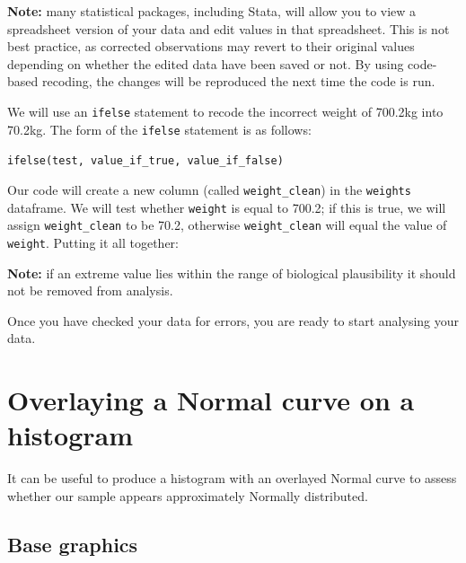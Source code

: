\documentclass[
]{memoir}
\newenvironment{Shaded}{\begin{snugshade}}{\end{snugshade}}
\newcommand{\FloatTok}[1]{\textcolor[rgb]{0.00,0.00,0.81}{#1}}
\newcommand{\FunctionTok}[1]{\textcolor[rgb]{0.00,0.00,0.00}{#1}}
\newcommand{\NormalTok}[1]{#1}
\newcommand{\OtherTok}[1]{\textcolor[rgb]{0.56,0.35,0.01}{#1}}
\newcommand{\SpecialCharTok}[1]{\textcolor[rgb]{0.00,0.00,0.00}{#1}}
\begin{document}
\textbf{Note:} many statistical packages, including Stata, will allow you to view a spreadsheet version of your data and edit values in that spreadsheet. This is not best practice, as corrected observations may revert to their original values depending on whether the edited data have been saved or not. By using code-based recoding, the changes will be reproduced the next time the code is run.

We will use an \texttt{ifelse} statement to recode the incorrect weight of 700.2kg into 70.2kg. The form of the \texttt{ifelse} statement is as follows:

\texttt{ifelse(test,\ value\_if\_true,\ value\_if\_false)}

Our code will create a new column (called \texttt{weight\_clean}) in the \texttt{weights} dataframe. We will test whether \texttt{weight} is equal to 700.2; if this is true, we will assign \texttt{weight\_clean} to be 70.2, otherwise \texttt{weight\_clean} will equal the value of \texttt{weight}. Putting it all together:

\begin{Shaded}
\end{Shaded}

\textbf{Note:} if an extreme value lies within the range of biological plausibility it should not be removed from analysis.

Once you have checked your data for errors, you are ready to start analysing your data.

\hypertarget{overlaying-a-normal-curve-on-a-histogram}{%
\section{Overlaying a Normal curve on a histogram}\label{overlaying-a-normal-curve-on-a-histogram}}

It can be useful to produce a histogram with an overlayed Normal curve to assess whether our sample appears approximately Normally distributed.

\hypertarget{base-graphics}{%
\subsection{Base graphics}\label{base-graphics}}
\end{document}
